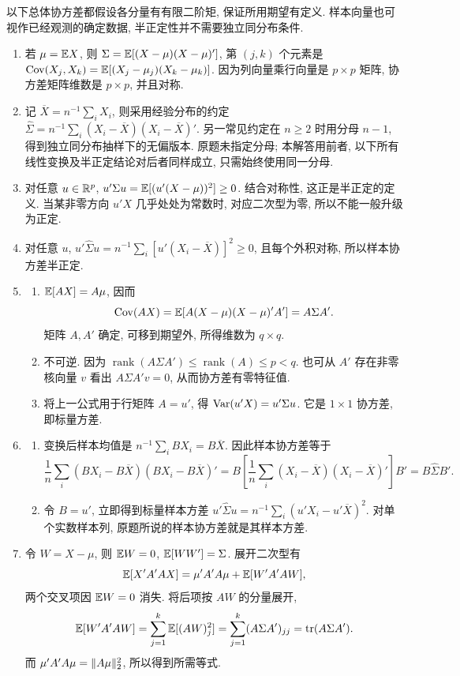 \begin{solution}
以下总体协方差都假设各分量有有限二阶矩, 保证所用期望有定义. 样本向量也可视作已经观测的确定数据, 半正定性并不需要独立同分布条件.
\begin{enumerate}[label=\arabic*.]
\item 若 $\mu=\mathbb E X$, 则 $\Sigma=\mathbb E[(X-\mu)(X-\mu)']$, 第 $(j,k)$ 个元素是 $\operatorname{Cov}(X_j,X_k)=\mathbb E[(X_j-\mu_j)(X_k-\mu_k)]$. 因为列向量乘行向量是 $p\times p$ 矩阵, 协方差矩阵维数是 $p\times p$, 并且对称.
\item 记 $\overline X=n^{-1}\sum_iX_i$, 则采用经验分布的约定 $\widehat\Sigma=n^{-1}\sum_i(X_i-\overline X)(X_i-\overline X)'$. 另一常见约定在 $n\ge2$ 时用分母 $n-1$, 得到独立同分布抽样下的无偏版本. 原题未指定分母; 本解答用前者, 以下所有线性变换及半正定结论对后者同样成立, 只需始终使用同一分母.
\item 对任意 $u\in\mathbb R^p$, $u'\Sigma u=\mathbb E[(u'(X-\mu))^2]\ge0$. 结合对称性, 这正是半正定的定义. 当某非零方向 $u'X$ 几乎处处为常数时, 对应二次型为零, 所以不能一般升级为正定.
\item 对任意 $u$, $u'\widehat\Sigma u=n^{-1}\sum_i[u'(X_i-\overline X)]^2\ge0$, 且每个外积对称, 所以样本协方差半正定.
\item
\begin{enumerate}[label=\alph*)]
\item $\mathbb E[AX]=A\mu$, 因而
\[
\operatorname{Cov}(AX)=\mathbb E[A(X-\mu)(X-\mu)'A']=A\Sigma A'.
\]
矩阵 $A,A'$ 确定, 可移到期望外, 所得维数为 $q\times q$.
\item 不可逆. 因为 $\operatorname{rank}(A\Sigma A')\le\operatorname{rank}(A)\le p<q$. 也可从 $A'$ 存在非零核向量 $v$ 看出 $A\Sigma A'v=0$, 从而协方差有零特征值.
\item 将上一公式用于行矩阵 $A=u'$, 得 $\operatorname{Var}(u'X)=u'\Sigma u$. 它是 $1\times1$ 协方差, 即标量方差.
\end{enumerate}
\item
\begin{enumerate}[label=\alph*)]
\item 变换后样本均值是 $n^{-1}\sum_iBX_i=B\overline X$. 因此样本协方差等于
\[
\frac1n\sum_i(BX_i-B\overline X)(BX_i-B\overline X)'
=B\left[\frac1n\sum_i(X_i-\overline X)(X_i-\overline X)'\right]B'
=B\widehat\Sigma B'.
\]
\item 令 $B=u'$, 立即得到标量样本方差 $u'\widehat\Sigma u=n^{-1}\sum_i(u'X_i-u'\overline X)^2$. 对单个实数样本列, 原题所说的样本协方差就是其样本方差.
\end{enumerate}
\item 令 $W=X-\mu$, 则 $\mathbb E W=0$, $\mathbb E[WW']=\Sigma$. 展开二次型有
\[
\mathbb E[X'A'AX]=\mu'A'A\mu+\mathbb E[W'A'AW],
\]
两个交叉项因 $\mathbb E W=0$ 消失. 将后项按 $AW$ 的分量展开,
\[
\mathbb E[W'A'AW]=\sum_{j=1}^k\mathbb E[(AW)_j^2]
=\sum_{j=1}^k(A\Sigma A')_{jj}=\operatorname{tr}(A\Sigma A').
\]
而 $\mu'A'A\mu=\lVert A\mu\rVert_2^2$, 所以得到所需等式.
\end{enumerate}
\end{solution}

